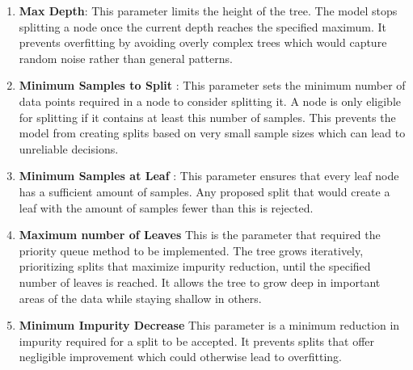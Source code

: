 \begin{enumerate}
    \item[a.] \textbf{Max Depth}:
    This parameter limits the height of the tree. The model stops splitting a node once the current depth reaches the specified maximum. It prevents overfitting by avoiding overly complex trees which would capture random noise rather than general patterns.
    \item[b.] \textbf{Minimum Samples to Split} :
    This parameter sets the minimum number of data points required in a node to consider splitting it. A node is only eligible for splitting if it contains at least this number of samples. This prevents the model from creating splits based on very small sample sizes which can lead to unreliable decisions.
    \item[c.] \textbf{Minimum Samples at Leaf} :
    This parameter ensures that every leaf node has a sufficient amount of samples. Any proposed split that would create a leaf with the amount of samples fewer than this is rejected. 
    \item[d.] \textbf{Maximum number of Leaves}
    This is the parameter that required the priority queue method to be implemented. The tree grows iteratively, prioritizing splits that maximize impurity reduction, until the specified number of leaves is reached. It allows the tree to grow deep in important areas of the data while staying shallow in others. 
    \item[e.] \textbf{Minimum Impurity Decrease} 
    This parameter is a minimum reduction in impurity required for a split to be accepted. It prevents splits that offer negligible improvement which could otherwise lead to overfitting.
\end{enumerate}
